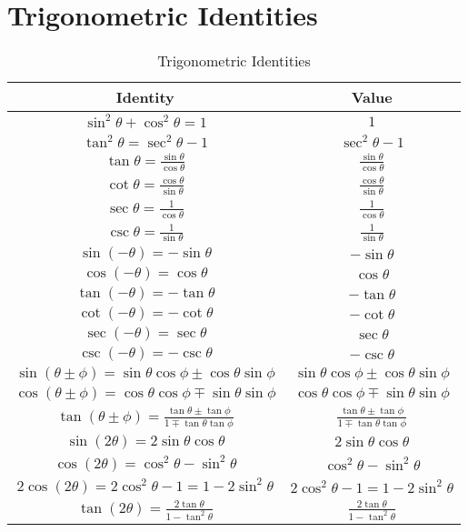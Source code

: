 \section{Trigonometric Identities}\label{app:trigIdentities}
\begin{table}
    \centering
    \begin{tabular}{|c|c|}
        \hline
        \textbf{Identity} & \textbf{Value} \\
        \hline
        $\sin^2\theta + \cos^2\theta = 1$ & $1$ \\
        $\tan^2\theta = \sec^2\theta - 1$ & $\sec^2\theta - 1$ \\
        $\tan\theta = \frac{\sin\theta}{\cos\theta}$ & $\frac{\sin\theta}{\cos\theta}$ \\
        $\cot\theta = \frac{\cos\theta}{\sin\theta}$ & $\frac{\cos\theta}{\sin\theta}$ \\
        $\sec\theta = \frac{1}{\cos\theta}$ & $\frac{1}{\cos\theta}$ \\
        $\csc\theta = \frac{1}{\sin\theta}$ & $\frac{1}{\sin\theta}$ \\
        $\sin(-\theta) = -\sin\theta$ & $-\sin\theta$ \\
        $\cos(-\theta) = \cos\theta$ & $\cos\theta$ \\
        $\tan(-\theta) = -\tan\theta$ & $-\tan\theta$ \\
        $\cot(-\theta) = -\cot\theta$ & $-\cot\theta$ \\
        $\sec(-\theta) = \sec\theta$ & $\sec\theta$ \\
        $\csc(-\theta) = -\csc\theta$ & $-\csc\theta$ \\
        $\sin(\theta \pm \phi) = \sin\theta\cos\phi \pm \cos\theta\sin\phi$ & $\sin\theta\cos\phi \pm \cos\theta\sin\phi$ \\
        $\cos(\theta \pm \phi) = \cos\theta\cos\phi \mp \sin\theta\sin\phi$ & $\cos\theta\cos\phi \mp \sin\theta\sin\phi$ \\
        $\tan(\theta \pm \phi) = \frac{\tan\theta \pm \tan\phi}{1 \mp \tan\theta\tan\phi}$ & $\frac{\tan\theta \pm \tan\phi}{1 \mp \tan\theta\tan\phi}$ \\
        $\sin(2\theta) = 2\sin\theta\cos\theta$ & $2\sin\theta\cos\theta$ \\
        $\cos(2\theta) = \cos^2\theta - \sin^2\theta$ & $\cos^2\theta - \sin^2\theta$ \\
        $2\cos(2\theta) = 2\cos^2\theta - 1 = 1 - 2\sin^2\theta$ & $2\cos^2\theta - 1 = 1 - 2\sin^2\theta$ \\
        $\tan(2\theta) = \frac{2\tan\theta}{1 - \tan^2\theta}$ & $\frac{2\tan\theta}{1 - \tan^2\theta}$ \\
        \hline
    \end{tabular}
    \caption{Trigonometric Identities}
    \label{tab:trigIdentities}
\end{table}
